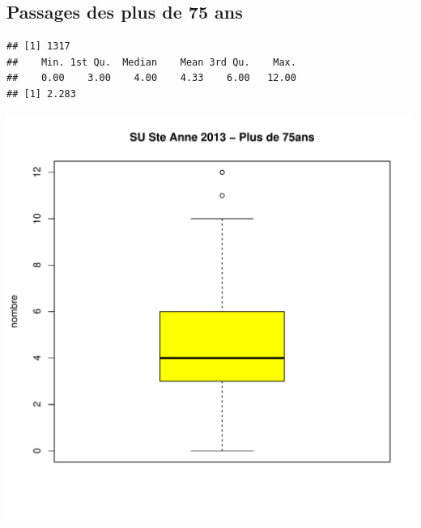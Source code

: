 \documentclass[12pt,english,french,twoside]{report}\usepackage[]{graphicx}\usepackage[]{color}
\makeatletter
\def\maxwidth{ %
  \ifdim\Gin@nat@width>\linewidth
    \linewidth
  \else
    \Gin@nat@width
  \fi
}
\newenvironment{kframe}{%
 \def\at@end@of@kframe{}%
 \ifinner\ifhmode%
  \def\at@end@of@kframe{\end{minipage}}%
  \begin{minipage}{\columnwidth}%
 \fi\fi%
 \def\FrameCommand##1{\hskip\@totalleftmargin \hskip-\fboxsep
 \colorbox{shadecolor}{##1}\hskip-\fboxsep
     \hskip-\linewidth \hskip-\@totalleftmargin \hskip\columnwidth}%
 \MakeFramed {\advance\hsize-\width
   \@totalleftmargin\z@ \linewidth\hsize
   \@setminipage}}%
 {\par\unskip\endMakeFramed%
 \at@end@of@kframe}
\newenvironment{knitrout}{}{} %
\makeatother
\begin{document}
\begin{knitrout}
\end{knitrout}



\subsection{Passages des plus de 75 ans}

\begin{knitrout}
\color{fgcolor}\begin{kframe}
\begin{verbatim}
## [1] 1317
##    Min. 1st Qu.  Median    Mean 3rd Qu.    Max. 
##    0.00    3.00    4.00    4.33    6.00   12.00
## [1] 2.283
\end{verbatim}
\end{kframe}
\includegraphics[width=\maxwidth]{figure/stAnne_sup75_passages1} 


\end{knitrout}
\end{document}
